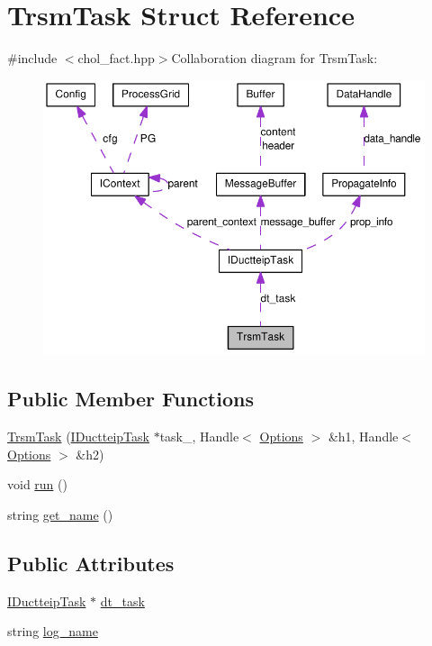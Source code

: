 \hypertarget{struct_trsm_task}{
\section{TrsmTask Struct Reference}
\label{struct_trsm_task}
}


{\ttfamily \#include $<$chol\_\-fact.hpp$>$}Collaboration diagram for TrsmTask:\nopagebreak
\begin{figure}[H]
\begin{center}
\leavevmode
\includegraphics[width=394pt]{struct_trsm_task__coll__graph}
\end{center}
\end{figure}
\subsection*{Public Member Functions}
\begin{DoxyCompactItemize}
\item 
\hyperlink{struct_trsm_task_a4c2b483737bcde446760a92ce1947640}{TrsmTask} (\hyperlink{class_i_ductteip_task}{IDuctteipTask} $\ast$task\_\-, Handle$<$ \hyperlink{struct_options}{Options} $>$ \&h1, Handle$<$ \hyperlink{struct_options}{Options} $>$ \&h2)
\item 
void \hyperlink{struct_trsm_task_ae66d4dcdaa716dd1a19d2b5f08eb0c52}{run} ()
\item 
string \hyperlink{struct_trsm_task_a8d5ce47ea63b7601eda61cc6468ee2eb}{get\_\-name} ()
\end{DoxyCompactItemize}
\subsection*{Public Attributes}
\begin{DoxyCompactItemize}
\item 
\hyperlink{class_i_ductteip_task}{IDuctteipTask} $\ast$ \hyperlink{struct_trsm_task_a8e255de9073927c7aa5de446491ec127}{dt\_\-task}
\item 
string \hyperlink{struct_trsm_task_a38d401b01930562a1b8a21e8bae749a4}{log\_\-name}
\end{DoxyCompactItemize}


